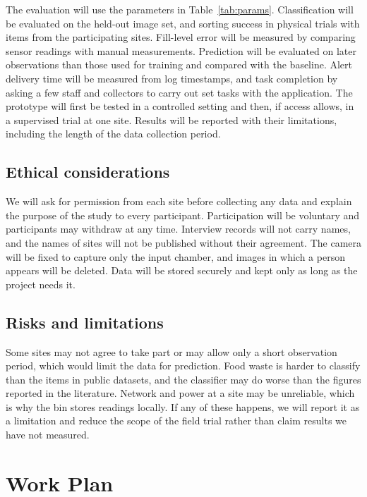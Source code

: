 \documentclass[12pt,a4paper]{report}
\begin{document}
The evaluation will use the parameters in Table~\ref{tab:params}. Classification will be evaluated on the held-out image set, and sorting success in physical trials with items from the participating sites. Fill-level error will be measured by comparing sensor readings with manual measurements. Prediction will be evaluated on later observations than those used for training and compared with the baseline. Alert delivery time will be measured from log timestamps, and task completion by asking a few staff and collectors to carry out set tasks with the application. The prototype will first be tested in a controlled setting and then, if access allows, in a supervised trial at one site. Results will be reported with their limitations, including the length of the data collection period.

\section{Ethical considerations}

We will ask for permission from each site before collecting any data and explain the purpose of the study to every participant. Participation will be voluntary and participants may withdraw at any time. Interview records will not carry names, and the names of sites will not be published without their agreement. The camera will be fixed to capture only the input chamber, and images in which a person appears will be deleted. Data will be stored securely and kept only as long as the project needs it.

\section{Risks and limitations}

Some sites may not agree to take part or may allow only a short observation period, which would limit the data for prediction. Food waste is harder to classify than the items in public datasets, and the classifier may do worse than the figures reported in the literature. Network and power at a site may be unreliable, which is why the bin stores readings locally. If any of these happens, we will report it as a limitation and reduce the scope of the field trial rather than claim results we have not measured.

\chapter{Work Plan}
\end{document}
